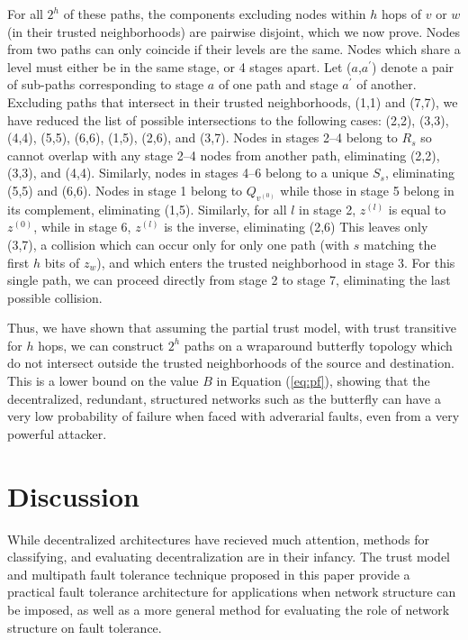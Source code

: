 \documentclass{sig-alternate-05-2015}
\begin{document}
For all $2^h$ of these paths, the components excluding nodes within $h$ hops
of $v$ or $w$ (in their trusted neighborhoods) are pairwise disjoint,
which we now prove.
Nodes from two paths can only coincide if their levels are the same.
Nodes which share a level must either be in the same stage, or 4 stages
apart.
Let ($a$,$a^\prime$) denote a pair of sub-paths corresponding to stage $a$ of
one path and stage $a^\prime$ of another.
Excluding paths that intersect in their trusted neighborhoods, (1,1) and (7,7),
we have reduced the list of possible intersections to the following cases:
(2,2), (3,3), (4,4), (5,5), (6,6), (1,5), (2,6), and (3,7).
Nodes in stages 2--4 belong to $R_s$ so cannot overlap with any stage 2--4
nodes from another path, eliminating (2,2), (3,3), and (4,4).
Similarly, nodes in stages 4--6 belong to a unique $S_s$,
eliminating (5,5) and (6,6).
Nodes in stage 1 belong to $Q_{v^{(0)}}$ while those in stage 5 belong in
its complement, eliminating (1,5).
Similarly, for all $l$ in stage 2, $z^{(l)}$ is equal to $z^{(0)}$,
while in stage 6, $z^{(l)}$ is the inverse, eliminating (2,6)
This leaves only (3,7), a collision which can occur only for only one path
(with $s$ matching the first $h$ bits of $z_w$), and which enters the trusted
neighborhood in stage 3.
For this single path, we can proceed directly from stage 2 to stage 7,
eliminating the last possible collision.

Thus, we have shown that assuming the partial trust model, with trust transitive
for $h$ hops, we can construct $2^h$ paths on a wraparound butterfly topology
which do not intersect outside the trusted neighborhoods of the source and
destination.
This is a lower bound on the value $B$ in Equation (\ref{eq:pf}),
showing that the decentralized, redundant, structured networks such as the
butterfly can have a very low probability of failure when faced with
adverarial faults, even from a very powerful attacker.

\section{Discussion}

While decentralized architectures have recieved much attention,
methods for classifying, and evaluating decentralization
are in their infancy.
The trust model and multipath fault tolerance technique proposed in this
paper provide a practical fault tolerance architecture for applications when
network structure can be imposed,
as well as a more general method for evaluating the role of network structure
on fault tolerance.
\end{document}
